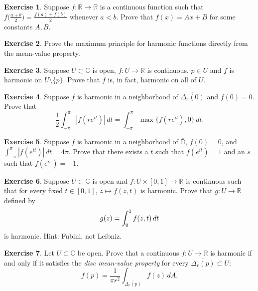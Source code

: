\documentclass[12pt,openany]{book}
\newcommand{\avoidbreak}{\postdisplaypenalty=100}
\newcommand{\abs}[1]{\left\lvert {#1} \right\rvert}
\newcommand{\C}{{\mathbb{C}}}
\newcommand{\R}{{\mathbb{R}}}
\newcommand{\D}{{\mathbb{D}}}
\newcommand{\myindex}[1]{#1\index{#1}}
\theoremstyle{plain}
\theoremstyle{remark}
\theoremstyle{definition}
\newenvironment{exbox}{%
    \def\FrameCommand{\vrule width 1pt \relax\hspace{10pt}}%
    \MakeFramed{\advance\hsize-\width\FrameRestore}%
}{%
    \endMakeFramed
}
\theoremstyle{exercise}
\newtheorem{exercise}{Exercise}[section]
\theoremstyle{example}
\begin{document}
\begin{exbox}
\begin{exercise}
Suppose $f \colon \R \to \R$ is a continuous function such that
$f\bigl(\frac{a+b}{2}\bigr) = \frac{f(a)+f(b)}{2}$ whenever $a < b$.
Prove that $f(x) = Ax + B$ for some constants $A,B$.
\end{exercise}

\begin{exercise}
Prove the maximum principle for harmonic functions directly from the
mean-value property.
\end{exercise}

\begin{exercise}
Suppose $U \subset \C$ is open, $f \colon U \to \R$ is continuous, $p \in U$
and $f$ is harmonic on $U \setminus \{ p \}$.  Prove that $f$ is, in fact,
harmonic on all of $U$.
\end{exercise}

\begin{exercise}
Suppose $f$ is harmonic in a neighborhood of
$\overline{\Delta_r(0)}$ and
$f(0) = 0$.  Prove that
\begin{equation*}
\frac{1}{2} \int_{-\pi}^\pi \abs{f(re^{it})} \, dt = 
\int_{-\pi}^\pi \max \{ f(re^{it}), 0 \} \, dt .
\end{equation*}
\end{exercise}

\begin{exercise}
Suppose $f$ is harmonic in a neighborhood of
$\overline{\D}$, $f(0) = 0$, and $\int_{-\pi}^\pi \abs{f(e^{it})}\, dt =
4\pi$.
Prove that there exists a $t$ such that $f(e^{it}) = 1$ and an $s$ such that
$f(e^{is}) = -1$.
\end{exercise}

\begin{exercise}
Suppose $U \subset \C$ is open and
$f \colon U \times [0,1] \to \R$ is continuous
such that for every fixed $t \in [0,1]$, $z \mapsto f(z,t)$ is harmonic.
Prove that $g \colon U \to \R$ defined by
\begin{equation*}
g(z) = \int_0^1 f(z,t) \, dt
\avoidbreak
\end{equation*}
is harmonic.  Hint: Fubini, not Leibniz.
\end{exercise}

\begin{exercise}
Let $U \subset \C$ be open.
Prove that a continuous $f \colon U \to \R$
is harmonic if and only if it satisfies the
\emph{\myindex{disc mean-value property}} for every $\overline{\Delta_r(p)}
\subset U$:
\begin{equation*}
f(p) = 
\frac{1}{\pi r^2} \int_{\overline{\Delta_r(p)}} f(z) \, dA.
\end{equation*}
\end{exercise}


\end{exbox}
\end{document}
